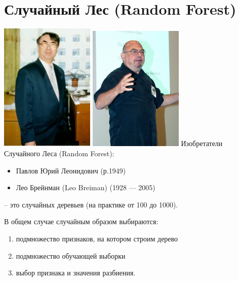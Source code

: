 \section{Случайный Лес (Random Forest)}\label{section:random_forest}

\begin{frame}
	\includegraphics[width=4.5cm]{../pic/ylpavlov.png}
	\includegraphics[width=4.5cm]{../pic/leo_breiman.png}
	Изобретатели Случайного Леса (Random Forest):
	\begin{itemize}
	\item Павлов Юрий Леонидович (р.1949)
	\item Лео Брейнман (Leo Breiman) (1928 — 2005)
	\end{itemize}
\end{frame}

\begin{frame}
	 -- это 
	случайных деревьев (на практике от 100 до 1000).
	
	В общем случае случайным образом выбираются:
	\begin{enumerate}
	\item подмножество признаков, на котором строим дерево
	\item подмножество обучающей выборки
	\item выбор признака и значения разбиения.
	\end{enumerate}	
\end{frame}

